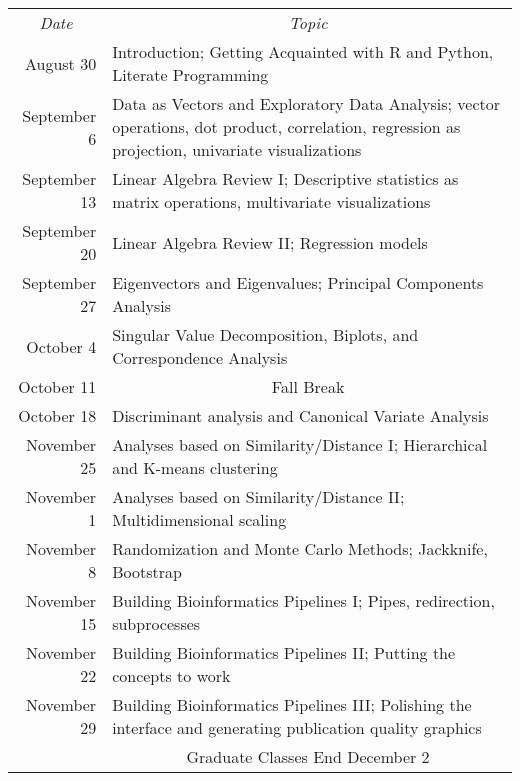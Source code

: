 \documentclass[11pt,letterpaper]{article}
\begin{document}
\renewcommand{\arraystretch}{1.4}
\begin{center}
\begin{tabular}{rp{5.5in}}
\multicolumn{1}{c}{{\sl Date}} & \multicolumn{1}{c}{{\sl Topic}} \\
August 30 & Introduction; Getting Acquainted with R and Python, Literate Programming \\
September 6 & Data as Vectors and Exploratory Data Analysis; vector operations, dot product, correlation, regression as projection, univariate visualizations\\
September 13 & Linear Algebra Review I; Descriptive statistics as matrix operations, multivariate visualizations \\
September 20 & Linear Algebra Review II; Regression models \\
September 27 & Eigenvectors and Eigenvalues; Principal Components Analysis \\
October 4 & Singular Value Decomposition, Biplots, and Correspondence Analysis\\
October 11 & \multicolumn{1}{c}{{\sc Fall Break}} \\
October 18 & Discriminant analysis and Canonical Variate Analysis\\
November 25 & Analyses based on Similarity/Distance I; Hierarchical and K-means clustering\\
November 1 & Analyses based on Similarity/Distance II; Multidimensional scaling\\
November 8 & Randomization and Monte Carlo Methods; Jackknife, Bootstrap\\
November 15 & Building Bioinformatics Pipelines I; Pipes, redirection, subprocesses \\
November 22 & Building Bioinformatics Pipelines II; Putting the concepts to work \\ 
November 29 & Building Bioinformatics Pipelines III; Polishing the interface and generating publication quality graphics \\ 
& \multicolumn{1}{c}{{\sc Graduate Classes End December 2}} \\
\end{tabular}
\end{center}
\end{document}

